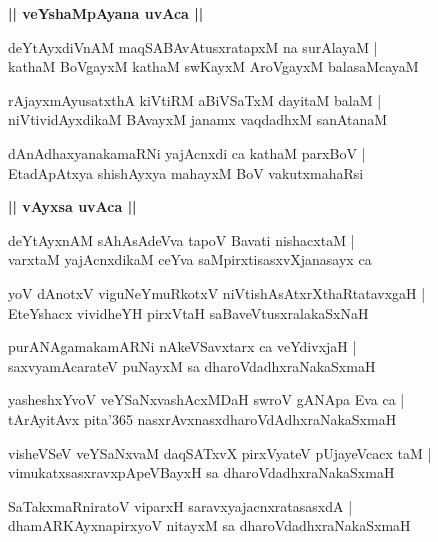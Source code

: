 \documentclass[twoside,12pt,openright]{book}
\newcounter{shloka}[chapter]
\def\uvaca#1{\centerline{{\large\textbf{#1}}}}
\begin{document}
\uvaca{|| veYshaMpAyana uvAca ||}

\begin{shloka}%
deYtAyxdiVnAM maqSABAvAtusxratapxM na surAlayaM |\\
kathaM BoVgayxM kathaM swKayxM AroVgayxM balasaMcayaM 
\end{shloka}

\begin{shloka}%
rAjayxmAyusatxthA kiVtiRM aBiVSaTxM dayitaM balaM |\\
niVtividAyxdikaM BAvayxM janamx vaqdadhxM sanAtanaM 
\end{shloka}

\begin{shloka}%
dAnAdhaxyanakamaRNi yajAcnxdi ca  kathaM parxBoV |\\
EtadApAtxya shishAyxya mahayxM BoV vakutxmahaRsi
\end{shloka}

\uvaca{|| vAyxsa uvAca ||}

\begin{shloka}%
deYtAyxnAM sAhAsAdeVva tapoV Bavati nishacxtaM |\\
varxtaM yajAcnxdikaM ceYva saMpirxtisasxvXjanasayx ca 
\end{shloka}

\begin{shloka}%
yoV dAnotxV viguNeYmuRkotxV niVtishAsAtxrXthaRtatavxgaH |\\
EteYshacx vividheYH pirxVtaH saBaveVtusxralakaSxNaH 
\end{shloka}

\begin{shloka}%
purANAgamakamARNi nAkeVSavxtarx ca veYdivxjaH |\\
saxvyamAcarateV puNayxM sa dharoVdadhxraNakaSxmaH 
\end{shloka}

\begin{shloka}%
yasheshxYvoV veYSaNxvashAcxMDaH swroV gANApa Eva ca |\\
tArAyitAvx pita\char'365 nasxrAvxnasxdharoVdAdhxraNakaSxmaH 
\end{shloka}

\begin{shloka}%
visheVSeV veYSaNxvaM daqSATxvX pirxVyateV pUjayeVcacx taM |\\
vimukatxsasxravxpApeVBayxH sa dharoVdadhxraNakaSxmaH
\end{shloka}

\begin{shloka}%
SaTakxmaRniratoV viparxH saravxyajacnxratasasxdA |\\
dhamARKAyxnapirxyoV nitayxM sa dharoVdadhxraNakaSxmaH 
\end{shloka}
\end{document}
